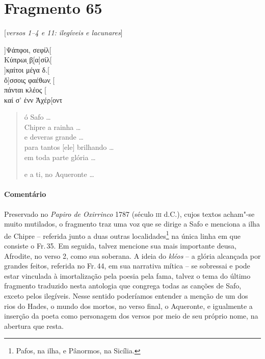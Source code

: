 \pagebreak


\section{Fragmento 65}

\begin{gkverse}

\textnormal{[\textit{versos 1--4 e 11: ilegíveis e lacunares}]}

]Ψάπφοι, σεφίλ[\\
Κύπρωι ̣β̣[α]σίλ[\\
]κ̣αίτοι μέγα δ.[\\
ὄ]σσοις φαέθων̣ [\\
πάνται κλέος [\\
καί σ’ ἐνν Ἀχέρ[οντ 
\end{gkverse}

\begin{verse}
ó Safo \ldots{}\\
[em] Chipre a rainha \ldots{}\\
e deveras grande \ldots{}\\
para tantos [ele] brilhando \ldots{}\\
em toda parte glória \ldots{}

e a ti, no Aqueronte \ldots{}\\
\end{verse}

\medskip

{\paragraph{Comentário} Preservado no \textit{Papiro de Oxirrinco} 1787  (século \textsc{iii} d.C.), cujos textos acham"-se muito mutilados, o fragmento traz uma voz que se dirige a Safo e menciona a ilha de Chipre -- referida junto a duas outras localidades\footnote{Pafos, na ilha, e Pânormos, na Sicília.} na única linha em que consiste o Fr.\,35. Em seguida, talvez mencione sua mais importante deusa, Afrodite, no verso 2, como sua soberana. A ideia do \textit{kléos} -- a glória alcançada por grandes feitos, referida no Fr.\,44, em sua narrativa mítica -- se sobressai e pode estar vinculada à imortalização pela poesia pela fama, talvez o tema do último fragmento traduzido nesta antologia que congrega todas as canções de Safo, exceto pelos ilegíveis. Nesse sentido poderíamos entender a menção de um dos rios do Hades, o mundo dos mortos, no verso final, o Aqueronte, e igualmente a inserção da poeta como personagem dos versos por meio de seu próprio nome, na abertura que resta.}


